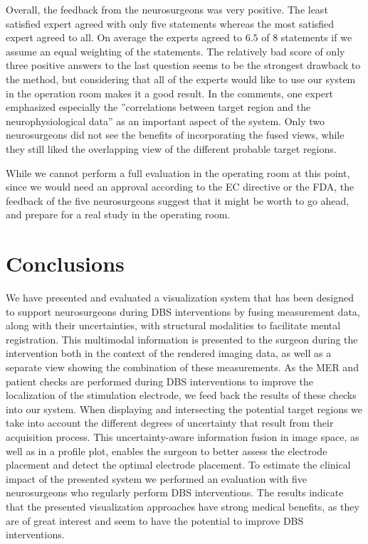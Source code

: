 \documentclass{egpubl}
\begin{document}
Overall, the feedback from the neurosurgeons was very positive. The least satisfied expert agreed with only five statements whereas the most satisfied expert agreed to all. On average the experts agreed to $6.5$ of $8$ statements if we assume an equal weighting of the statements. The relatively bad score of only three positive answers to the last question seems to be the strongest drawback to the method, but considering that all of the experts would like to use our system in the operation room makes it a good result. In the comments, one expert emphasized especially the ''correlations between target region and the neurophysiological data'' as an important aspect of the system. Only two neurosurgeons did not see the benefits of incorporating the fused views, while they still liked the overlapping view of the different probable target regions.

While we cannot perform a full evaluation in the operating room at this point, since we would need an approval according to the EC directive or the FDA, the feedback of the five neurosurgeons suggest that it might be worth to go ahead, and prepare for a real study in the operating room.


\section{Conclusions}\label{sec:conclusions}
We have presented and evaluated a visualization system that has been designed to support neurosurgeons during DBS interventions by fusing measurement data, along with their uncertainties, with structural modalities to facilitate mental registration. This multimodal information is presented to the surgeon during the intervention both in the context of the rendered imaging data, as well as a separate view showing the combination of these measurements. As the MER and patient checks are performed during DBS interventions to improve the localization of the stimulation electrode, we feed back the results of these checks into our system. When displaying and intersecting the potential target regions we take into account the different degrees of uncertainty that result from their acquisition process. This uncertainty-aware information fusion in image space, as well as in a profile plot, enables the surgeon to better assess the electrode placement and detect the optimal electrode placement. To estimate the clinical impact of the presented system we performed an evaluation with five neurosurgeons who regularly perform DBS interventions. The results indicate that the presented visualization approaches have strong medical benefits, as they are of great interest and seem to have the potential to improve DBS interventions.
%
\end{document}
